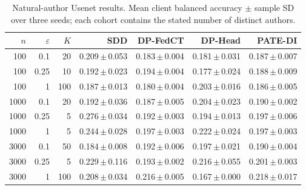 \begin{table}[t]
\centering
\caption{Natural-author Usenet results. Mean client balanced accuracy $\pm$ sample SD over three seeds; each cohort contains the stated number of distinct authors.}
\label{tab:new-web}
\small\setlength{\tabcolsep}{3pt}
\begin{tabular}{@{}rrrrrrr@{}}\toprule
$n$ & $\varepsilon$ & $K$ & SDD & DP-FedCT & DP-Head & PATE-DI \\\midrule
100 & 0.1 & 20 & 0.209\,$\pm$\,0.053 & 0.183\,$\pm$\,0.004 & 0.181\,$\pm$\,0.031 & 0.187\,$\pm$\,0.007 \\
100 & 0.25 & 10 & 0.192\,$\pm$\,0.023 & 0.194\,$\pm$\,0.004 & 0.177\,$\pm$\,0.024 & 0.188\,$\pm$\,0.009 \\
100 & 1 & 100 & 0.187\,$\pm$\,0.013 & 0.180\,$\pm$\,0.004 & 0.203\,$\pm$\,0.016 & 0.186\,$\pm$\,0.005 \\
1000 & 0.1 & 20 & 0.192\,$\pm$\,0.036 & 0.187\,$\pm$\,0.005 & 0.204\,$\pm$\,0.023 & 0.190\,$\pm$\,0.002 \\
1000 & 0.25 & 5 & 0.276\,$\pm$\,0.034 & 0.192\,$\pm$\,0.003 & 0.194\,$\pm$\,0.013 & 0.197\,$\pm$\,0.006 \\
1000 & 1 & 5 & 0.244\,$\pm$\,0.028 & 0.197\,$\pm$\,0.003 & 0.222\,$\pm$\,0.024 & 0.197\,$\pm$\,0.003 \\
3000 & 0.1 & 50 & 0.184\,$\pm$\,0.008 & 0.192\,$\pm$\,0.006 & 0.197\,$\pm$\,0.021 & 0.190\,$\pm$\,0.004 \\
3000 & 0.25 & 5 & 0.229\,$\pm$\,0.116 & 0.193\,$\pm$\,0.002 & 0.216\,$\pm$\,0.055 & 0.201\,$\pm$\,0.003 \\
3000 & 1 & 100 & 0.208\,$\pm$\,0.034 & 0.216\,$\pm$\,0.005 & 0.167\,$\pm$\,0.000 & 0.218\,$\pm$\,0.017 \\
\bottomrule\end{tabular}
\end{table}
